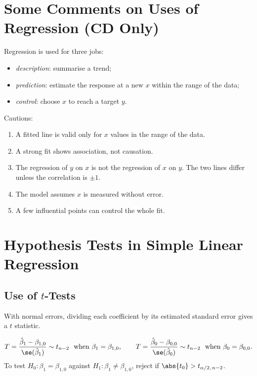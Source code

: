 \section{Some Comments on Uses of Regression (CD Only)}

Regression is used for three jobs:
\begin{itemize}
  \item \emph{description}: summarise a trend;
  \item \emph{prediction}: estimate the response at a new $x$ within the range of the data;
  \item \emph{control}: choose $x$ to reach a target $y$.
\end{itemize}
Cautions:
\begin{enumerate}
  \item A fitted line is valid only for $x$ values in the range of the data.
  \item A strong fit shows association, not causation.
  \item The regression of $y$ on $x$ is not the regression of $x$ on $y$. The two lines differ unless the correlation is $\pm1$.
  \item The model assumes $x$ is measured without error.
  \item A few influential points can control the whole fit.
\end{enumerate}

\section{Hypothesis Tests in Simple Linear Regression}

\subsection{Use of $t$-Tests}

With normal errors, dividing each coefficient by its estimated standard error gives a $t$ statistic.

\begin{theorem}\label{thm:regt}
\[ T=\frac{\hat\beta_1-\beta_{1,0}}{\se(\hat\beta_1)}\sim t_{n-2}\ \text{ when }\beta_1=\beta_{1,0},\qquad T=\frac{\hat\beta_0-\beta_{0,0}}{\se(\hat\beta_0)}\sim t_{n-2}\ \text{ when }\beta_0=\beta_{0,0}. \]
To test $H_0:\beta_1=\beta_{1,0}$ against $H_1:\beta_1\ne\beta_{1,0}$, reject if $\abs{t_0}>t_{\alpha/2,\,n-2}$.
\end{theorem}

